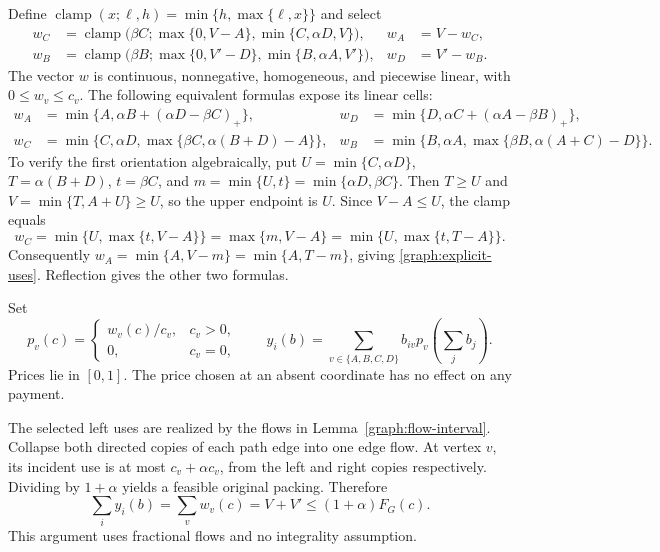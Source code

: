 \documentclass[11pt]{article}
\theoremstyle{definition}\newtheorem{definition}[theorem]{Definition}
\theoremstyle{remark}\newtheorem{remark}[theorem]{Remark}
\begin{document}
Define $\operatorname{clamp}(x;\ell,h)=\min\{h,\max\{\ell,x\}\}$ and
select
\begin{align}
 w_C&=\operatorname{clamp}\bigl(\beta C;
             \max\{0,V-A\},\min\{C,\alpha D,V\}\bigr),
 &w_A&=V-w_C,\label{graph:selector}\\
 w_B&=\operatorname{clamp}\bigl(\beta B;
             \max\{0,V'-D\},\min\{B,\alpha A,V'\}\bigr),
 &w_D&=V'-w_B.\nonumber
\end{align}
The vector $w$ is continuous, nonnegative, homogeneous, and piecewise
linear, with $0\le w_v\le c_v$. The following equivalent formulas expose
its linear cells:
\begin{align}
 w_A&=\min\{A,\alpha B+(\alpha D-\beta C)_+\},
 &w_D&=\min\{D,\alpha C+(\alpha A-\beta B)_+\},\label{graph:explicit-uses}\\
 w_C&=\min\{C,\alpha D,\max\{\beta C,\alpha(B+D)-A\}\},
 &w_B&=\min\{B,\alpha A,\max\{\beta B,\alpha(A+C)-D\}\}.\nonumber
\end{align}
To verify the first orientation algebraically, put
$U=\min\{C,\alpha D\}$, $T=\alpha(B+D)$, $t=\beta C$, and
$m=\min\{U,t\}=\min\{\alpha D,\beta C\}$.
Then $T\ge U$ and $V=\min\{T,A+U\}\ge U$, so the upper endpoint is
$U$. Since $V-A\le U$, the clamp equals
\[
 w_C=\min\{U,\max\{t,V-A\}\}
     =\max\{m,V-A\}
     =\min\{U,\max\{t,T-A\}\}.
\]
Consequently
$w_A=\min\{A,V-m\}=\min\{A,T-m\}$, giving
\eqref{graph:explicit-uses}. Reflection gives the other two formulas.

Set
\begin{equation}\label{graph:prices}
 p_v(c)=\begin{cases}w_v(c)/c_v,&c_v>0,\\0,&c_v=0,\end{cases}
 \qquad y_i(b)=\sum_{v\in\{A,B,C,D\}}b_{iv}p_v\left(\sum_j b_j\right).
\end{equation}
Prices lie in $[0,1]$. The price chosen at an absent coordinate has no
effect on any payment.

The selected left uses are realized by the flows in
Lemma~\ref{graph:flow-interval}. Collapse both directed copies of each
path edge into one edge flow. At vertex $v$, its incident use is at most
$c_v+\alpha c_v$, from the left and right copies respectively. Dividing
by $1+\alpha$ yields a feasible original packing. Therefore
\begin{equation}\label{graph:flow-funding}
 \sum_i y_i(b)=\sum_v w_v(c)=V+V'\le(1+\alpha)F_G(c).
\end{equation}
This argument uses fractional flows and no integrality assumption.
\end{document}
